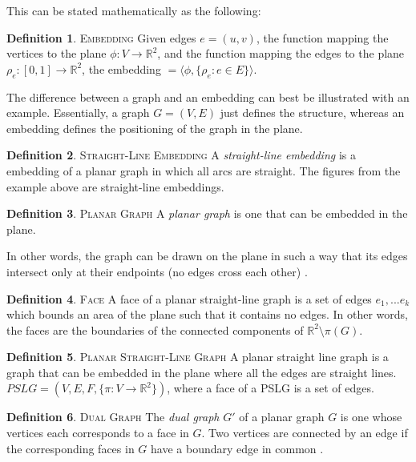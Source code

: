 \documentclass[11pt]{article}
\newcommand{\R}{\mathbb{R}}
\theoremstyle{definition}
\newtheorem{definition}{Definition}[section]
\begin{document}
	This can be stated mathematically as the following: 
	\theoremstyle{definition}
	\begin{definition}{\textsc{Embedding}}
		Given edges $e=(u,v)$, the function mapping the vertices to the plane $ \phi :V \rightarrow \R^2$, and the function mapping the edges to the plane $ \rho_e :[0,1] \rightarrow \R^2$, the embedding $= \langle \phi, \{\rho_e : e \in E \} \rangle$. 
	\end{definition}
		The difference between a graph and an embedding can best be illustrated with an example. 
		Essentially, a graph $G=(V,E)$ just defines the structure, whereas an embedding defines the positioning of the graph in the plane.
	
	\theoremstyle{definition}
	\begin{definition}{\textsc{Straight-Line Embedding}}
		A \emph{straight-line embedding} is a embedding of a planar graph in which all arcs are straight. The figures from the example above are straight-line embeddings.
  	\end{definition}
	
	\theoremstyle{definition}
	\begin{definition}{\textsc{Planar Graph}}
		A \emph{planar graph} is one that can be embedded in the plane.
	\end{definition}
	
	In other words, the graph can be drawn on the plane in such a way that its edges intersect only at their endpoints (no edges cross each other) \cite{mathworld:PlanarGraph}.
	
	\theoremstyle{definition}
	\begin{definition}{\textsc{Face}}
		A face of a planar straight-line graph is a set of edges ${e_1,...e_k}$ which bounds an area of the plane such that it contains no edges.
		In other words, the faces are the boundaries of the connected components of $\R^2 \setminus \pi(G)$.
	\end{definition}
	
	\theoremstyle{definition}
	\begin{definition}{\textsc{Planar Straight-Line Graph}}
		A planar straight line graph is a graph that can be embedded in the plane where all the edges are straight lines. $PSLG = (V,E,F, \{\pi : V \rightarrow \R^2 \})$, where a face of a PSLG is a set of edges.
	\end{definition}
	
	\theoremstyle{definition}
	\begin{definition}{\textsc{Dual Graph}}
		The \emph{dual graph} $G'$ of a planar graph $G$ is one whose vertices each corresponds to a face in $G$. 
		Two vertices are connected by an edge if the corresponding faces in $G$ have a boundary edge in common \cite{mathworld:dualGraph}. 
  	\end{definition}
\end{document}
